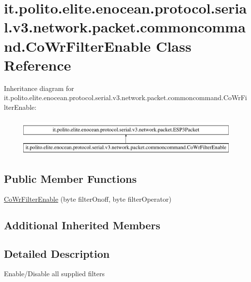\hypertarget{classit_1_1polito_1_1elite_1_1enocean_1_1protocol_1_1serial_1_1v3_1_1network_1_1packet_1_1commoncommand_1_1_co_wr_filter_enable}{}\section{it.\+polito.\+elite.\+enocean.\+protocol.\+serial.\+v3.\+network.\+packet.\+commoncommand.\+Co\+Wr\+Filter\+Enable Class Reference}
\label{classit_1_1polito_1_1elite_1_1enocean_1_1protocol_1_1serial_1_1v3_1_1network_1_1packet_1_1commoncommand_1_1_co_wr_filter_enable}
Inheritance diagram for it.\+polito.\+elite.\+enocean.\+protocol.\+serial.\+v3.\+network.\+packet.\+commoncommand.\+Co\+Wr\+Filter\+Enable\+:\begin{figure}[H]
\begin{center}
\leavevmode
\includegraphics[height=2.000000cm]{classit_1_1polito_1_1elite_1_1enocean_1_1protocol_1_1serial_1_1v3_1_1network_1_1packet_1_1commoncommand_1_1_co_wr_filter_enable}
\end{center}
\end{figure}
\subsection*{Public Member Functions}
\begin{DoxyCompactItemize}
\item 
\hyperlink{classit_1_1polito_1_1elite_1_1enocean_1_1protocol_1_1serial_1_1v3_1_1network_1_1packet_1_1commoncommand_1_1_co_wr_filter_enable_a7abb1045a8f8180c1d015b6a0e26048f}{Co\+Wr\+Filter\+Enable} (byte filter\+Onoff, byte filter\+Operator)
\end{DoxyCompactItemize}
\subsection*{Additional Inherited Members}


\subsection{Detailed Description}
Enable/\+Disable all supplied filters


